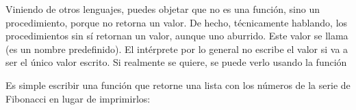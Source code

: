 \documentclass[a5paper,10pt,spanish]{sphinxmanual}
\begin{document}
\sphinxAtStartPar
Viniendo de otros lenguajes, puedes objetar que  no es una función, sino un procedimiento, porque no retorna un valor. De hecho, técnicamente hablando, los procedimientos sin  sí retornan un valor, aunque uno aburrido. Este valor se llama  (es un nombre predefinido). El intérprete por lo general no escribe el valor  si va a ser el único valor escrito. Si realmente se quiere, se puede verlo usando la función 

\begin{sphinxVerbatim}[commandchars=\\\{\}]
\end{sphinxVerbatim}

\sphinxAtStartPar
Es simple escribir una función que retorne una lista con los números de la serie de Fibonacci en lugar de imprimirlos:

\begin{sphinxVerbatim}[commandchars=\\\{\}]
   
    
      \PYG{p}{[}\PYG{p}{]}
        
       
            
            
     
      
                
\end{sphinxVerbatim}
\end{document}
